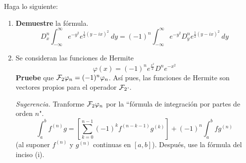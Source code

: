 \documentclass[12pt]{report}
\newcounter{it}
\theoremstyle{largebreak}
\newcommand{\fou}[1]{\ensuremath{\mathcal{F}#1}}
\begin{document}
    \begin{excer}
        Haga lo siguiente:
        \begin{enumerate}
            \item \textbf{Demuestre} la fórmula.
            \begin{equation*}
                D_x^n\int_{-\infty}^\infty e^{ -y^2}e^{\frac{1}{2}(y-ix)^2}\:dy=(-1)^n\int_{-\infty}^\infty e^{ -y^2}D_y^n e^{\frac{1}{2}(y-ix)^2}\:dy
            \end{equation*}
            \item Se consideran las funciones de Hermite
            \begin{equation*}
                \varphi(x)=(-1)^n e^{\frac{x^2}{2}}D^n e^{ -x^2}
            \end{equation*}
            \textbf{Pruebe} que $\fou_2{\varphi_n}=(-1)^n\varphi_n$. Así pues, las funciones de Hermite son vectores propios para el operador $\fou_2{\cdot}$.

            \textit{Sugerencia.} Tranforme $\fou_2{\varphi_n}$ por la ``fórmula de integración por partes de orden $n$".
            \begin{equation*}
                \int_a^b f^{(n)}g=\left[\sum_{ k=0}^{ n-1}(-1)^kf^{ (n-k-1)}g^{(k)} \right]+(-1)^n\int_a^b fg^{(n)}
            \end{equation*}
            (al suponer $f^{(n)}$ y $g^{(n)}$ continuas en $[a,b]$). Después, use la fórmula del inciso (i).
        \end{enumerate}
    \end{excer}
\end{document}
